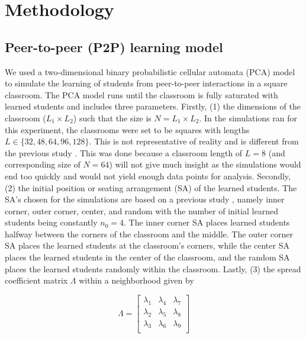 \documentclass[10pt,a4paper,twoside]{article}
\begin{document}
\section{Methodology}\label{sec:methods}
\subsection{Peer-to-peer (P2P) learning model}
We used a two-dimensional binary probabilistic cellular automata (PCA) model to simulate the learning of students from peer-to-peer interactions in a square classroom. The PCA model runs until the classroom is fully saturated with learned students and includes three parameters. Firstly, (1) the dimensions of the classroom ($L_1 \times L_2$) such that the size is $N=L_1 \times L_2$. In the simulations ran for this experiment, the classrooms were set to be squares with lengths $L \in \lbrace 32,48,64,96,128\rbrace$. This is not representative of reality and is different from the previous study \cite{roxas2010seating}. This was done because a classroom length of $L=8$ (and corresponding size of $N=64$) will not give much insight as the simulations would end too quickly and would not yield enough data points for analysis. Secondly, (2) the initial position or seating arrangement (SA) of the learned students. The SA's chosen for the simulations are based on a previous study \cite{roxas2010seating}, namely inner corner, outer corner, center, and random with the number of initial learned students being constantly $n_0 = 4$. The inner corner SA places learned students halfway between the corners of the classroom and the middle. The outer corner SA places the learned students at the classroom's corners, while the center SA places the learned students in the center of the classroom, and the random SA places the learned students randomly within the classroom. Lastly, (3) the spread coefficient matrix $\Lambda$ within a neighborhood given by 

\begin{equation}\label{eq:Lambda matrix}
  \Lambda = 
  \begin{bmatrix}
  \lambda_1 & \lambda_4 & \lambda_7\\
  \lambda_2 & \lambda_5 & \lambda_8\\
  \lambda_3 & \lambda_6 & \lambda_9\\
  \end{bmatrix}%
\end{equation}
\end{document}
